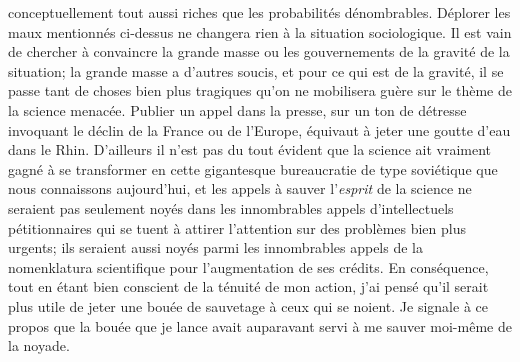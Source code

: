 conceptuellement tout aussi riches que les probabilit\'es d\'enombrables. 
\medskip 
D\'eplorer les maux mentionn\'es ci-dessus ne changera rien \`a la  
situation sociologique.  Il est vain de chercher \`a convaincre la grande 
masse ou les gouvernements de la gravit\'e de  la situation;  la grande 
masse a d'autres soucis, et pour ce  qui est de la gravit\'e, il  se passe 
tant de choses bien plus tra\-gi\-ques qu'on ne mobilisera gu\`ere sur  
le th\`eme de la science menac\'ee. Publier un  appel dans la presse, sur 
un ton de d\'etresse invoquant le d\'eclin de la France ou de l'Europe, 
\'equivaut \`a jeter une goutte d'eau dans le Rhin.  D'ailleurs il n'est pas 
du tout \'evident que la science ait vraiment gagn\'e \`a se transformer 
en cette gigantesque bureaucratie de type sovi\'etique que nous 
connaissons aujourd'hui, et  les appels \`a sauver l'{\it esprit} de la 
science ne seraient  pas seulement noy\'es dans les innombrables appels 
d'intellectuels p\'etitionnaires qui se tuent \`a attirer l'attention sur des 
probl\`emes  bien plus urgents; ils seraient aussi noy\'es parmi les 
innombrables appels de la nomenklatura scientifique pour l'augmentation 
de ses cr\'edits.  
\medskip 
En cons\'equence, tout en \'etant bien conscient de la t\'enuit\'e de mon 
action, j'ai pens\'e  qu'il serait plus utile de jeter une bou\'ee de 
sauvetage \`a ceux  qui se noient. Je signale \`a ce propos que la bou\'ee 
que je lance avait auparavant servi \`a me sauver moi-m\^eme de la 
noyade.  
\vskip12mm 
 
 
 
 
 
 
\bye 
